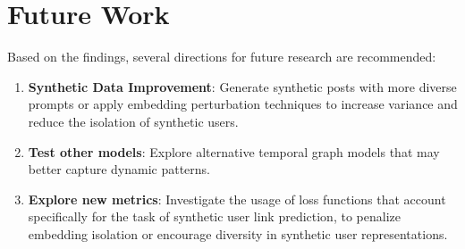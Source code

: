 \section{Future Work}

Based on the findings, several directions for future research are recommended:

\begin{enumerate}
	\item \textbf{Synthetic Data Improvement}: Generate synthetic posts with more diverse prompts or apply embedding perturbation techniques to increase variance and reduce the isolation of synthetic users.

	\item \textbf{Test other models}: Explore alternative temporal graph models that may better capture dynamic patterns.
	
	\item \textbf{Explore new metrics}: Investigate the usage of loss functions that account specifically for the task of synthetic user link prediction, to penalize embedding isolation or encourage diversity in synthetic user representations.
\end{enumerate}
